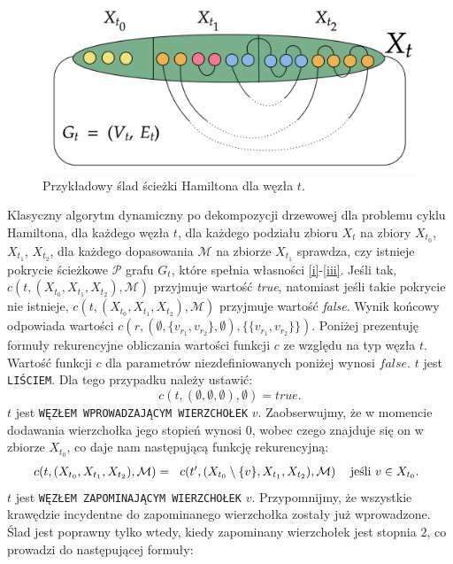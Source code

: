 \documentclass[12pt, oneside]{report}
\begin{document}
\begin{figure}
\centering
\includegraphics[width=16cm]{hamiltonian.png}
\caption{Przykładowy ślad ścieżki Hamiltona dla węzła $t$.}
\label{hamiltonian}
\end{figure} 

Klasyczny algorytm dynamiczny po dekompozycji drzewowej dla problemu cyklu Hamiltona, dla każdego węzła $t$, dla każdego podziału zbioru $X_t$ na zbiory $X_{t_0}$, $X_{t_1}$, $X_{t_2}$, dla każdego dopasowania $\mathcal{M}$ na zbiorze $X_{t_1}$ sprawdza, czy istnieje pokrycie ścieżkowe $\mathcal{P}$ grafu $G_t$, które spełnia własności \ref{i}-\ref{iii}. Jeśli tak, $c(t, (X_{t_0}, X_{t_1}, X_{t_2}), \mathcal{M})$ przyjmuje wartość \emph{true}, natomiast jeśli takie pokrycie nie istnieje, $c(t, (X_{t_0}, X_{t_1}, X_{t_2}), \mathcal{M})$ przyjmuje wartość \emph{false}. Wynik końcowy odpowiada wartości $c(r, (\emptyset, \{v_{r_1}, v_{r_2}\}, \emptyset), \{\{v_{r_1}, v_{r_2}\}\})$. Poniżej prezentuję formuły rekurencyjne obliczania wartości funkcji $c$ ze względu na typ węzła $t$. Wartość funkcji $c$ dla parametrów niezdefiniowanych poniżej wynosi $false$.
\newline\newline
$t$ jest \texttt{LIŚCIEM}. Dla tego przypadku należy ustawić:
$$c(t, (\emptyset, \emptyset, \emptyset), \emptyset) = true.$$
\newline
$t$ jest \texttt{WĘZŁEM WPROWADZAJĄCYM WIERZCHOŁEK} $v$. Zaobserwujmy, że w momencie dodawania wierzchołka jego stopień wynosi $0$, wobec czego znajduje się on w zbiorze $X_{t_0}$, co daje nam następującą funkcję rekurencyjną:
\[
c(t, (X_{t_0}, X_{t_1}, X_{t_2}), \mathcal{M}) =  
  \begin{tabular}{ccc}
  $c(t', (X_{t_0} \setminus \{v\}, X_{t_1}, X_{t_2}), \mathcal{M})$ & jeśli $v \in X_{t_0}$.\\
  \end{tabular}
\]
\newline
$t$ jest \texttt{WĘZŁEM ZAPOMINAJĄCYM WIERZCHOŁEK} $v$. Przypomnijmy, że wszystkie krawędzie incydentne do zapominanego wierzchołka zostały już wprowadzone. Ślad jest poprawny tylko wtedy, kiedy zapominany wierzchołek jest stopnia $2$, co prowadzi do następującej formuły:
\end{document}
